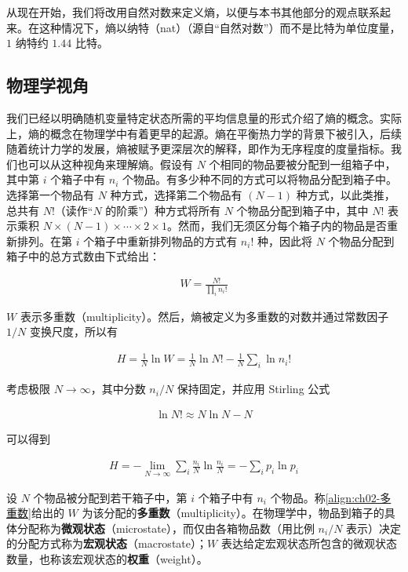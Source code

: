 \documentclass[../../main.tex]{subfiles}
\begin{document}
从现在开始，我们将改用自然对数来定义熵，以便与本书其他部分的观点联系起来。在这种情况下，熵以纳特（nat）（源自“自然对数”）而不是比特为单位度量，$1$ 纳特约 $1.44$ 比特。

\subsection{物理学视角}\label{subsection:ch02-物理学视角}

我们已经以明确随机变量特定状态所需的平均信息量的形式介绍了熵的概念。实际上，熵的概念在物理学中有着更早的起源。熵在平衡热力学的背景下被引入，后续随着统计力学的发展，熵被赋予更深层次的解释，即作为无序程度的度量指标。我们也可以从这种视角来理解熵。假设有 $N$ 个相同的物品要被分配到一组箱子中，其中第 $i$ 个箱子中有 $n_i$ 个物品。有多少种不同的方式可以将物品分配到箱子中。选择第一个物品有 $N$ 种方式，选择第二个物品有 $(N-1)$ 种方式，以此类推，总共有 $N!$（读作“$N$ 的阶乘”）种方式将所有 $N$ 个物品分配到箱子中，其中 $N!$ 表示乘积 $N\times(N-1)\times\cdots\times2\times1$。然而，我们无须区分每个箱子内的物品是否重新排列。在第 $i$ 个箱子中重新排列物品的方式有 $n_i!$ 种，因此将 $N$ 个物品分配到箱子中的总方式数由下式给出：

\begin{align}
  W = \frac{N!}{\prod_i n_i!}
  \label{align:ch02-多重数}
\end{align}

$W$ 表示多重数（multiplicity）。然后，熵被定义为多重数的对数并通过常数因子 $1/N$ 变换尺度，所以有

\begin{align}
  H = \frac{1}{N}\ln W = \frac{1}{N}\ln N! - \frac{1}{N}\sum_i\ln n_i!
  \label{align:ch02-熵与多重数}
\end{align}

考虑极限 $N\to\infty$，其中分数 $n_i/N$ 保持固定，并应用 Stirling 公式

\begin{align}
  \ln N! \approx N\ln N - N
  \label{align:ch02-Stirling}
\end{align}

可以得到

\begin{align}
  H = -\lim_{N\to\infty}\sum_i\frac{n_i}{N}\ln\frac{n_i}{N} = -\sum_i p_i\ln p_i
  \label{align:ch02-熵与概率}
\end{align}

\begin{definition}\label{definition:ch02-多重数}
设 $N$ 个物品被分配到若干箱子中，第 $i$ 个箱子中有 $n_i$ 个物品。称\eqref{align:ch02-多重数}给出的 $W$ 为该分配的\textbf{多重数}（multiplicity）。在物理学中，物品到箱子的具体分配称为\textbf{微观状态}（microstate），而仅由各箱物品数（用比例 $n_i/N$ 表示）决定的分配方式称为\textbf{宏观状态}（macrostate）；$W$ 表达给定宏观状态所包含的微观状态数量，也称该宏观状态的\textbf{权重}（weight）。
\end{definition}
\end{document}
